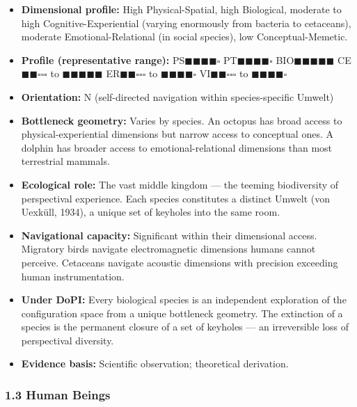 \begin{itemize}[nosep,leftmargin=*]
  \item \textbf{Dimensional profile:} High Physical-Spatial, high Biological, moderate to high Cognitive-Experiential (varying enormously from bacteria to cetaceans), moderate Emotional-Relational (in social species), low Conceptual-Memetic.
  \item \textbf{Profile (representative range):} PS$\blacksquare$$\blacksquare$$\blacksquare$$\blacksquare$$\square$ PT$\blacksquare$$\blacksquare$$\blacksquare$$\blacksquare$$\square$ BIO$\blacksquare$$\blacksquare$$\blacksquare$$\blacksquare$$\blacksquare$ CE$\blacksquare$$\blacksquare$$\square$$\square$$\square$ to $\blacksquare$$\blacksquare$$\blacksquare$$\blacksquare$$\blacksquare$ ER$\blacksquare$$\blacksquare$$\square$$\square$$\square$ to $\blacksquare$$\blacksquare$$\blacksquare$$\blacksquare$$\square$ VI$\blacksquare$$\blacksquare$$\square$$\square$$\square$ to $\blacksquare$$\blacksquare$$\blacksquare$$\blacksquare$$\square$
  \item \textbf{Orientation:} N (self-directed navigation within species-specific Umwelt)
  \item \textbf{Bottleneck geometry:} Varies by species. An octopus has broad access to physical-experiential dimensions but narrow access to conceptual ones. A dolphin has broader access to emotional-relational dimensions than most terrestrial mammals.
  \item \textbf{Ecological role:} The vast middle kingdom — the teeming biodiversity of perspectival experience. Each species constitutes a distinct Umwelt (von Uexküll, 1934), a unique set of keyholes into the same room.
  \item \textbf{Navigational capacity:} Significant within their dimensional access. Migratory birds navigate electromagnetic dimensions humans cannot perceive. Cetaceans navigate acoustic dimensions with precision exceeding human instrumentation.
  \item \textbf{Under DoPI:} Every biological species is an independent exploration of the configuration space from a unique bottleneck geometry. The extinction of a species is the permanent closure of a set of keyholes — an irreversible loss of perspectival diversity.
  \item \textbf{Evidence basis:} Scientific observation; theoretical derivation.
\end{itemize}


\subsubsection*{1.3 Human Beings}

